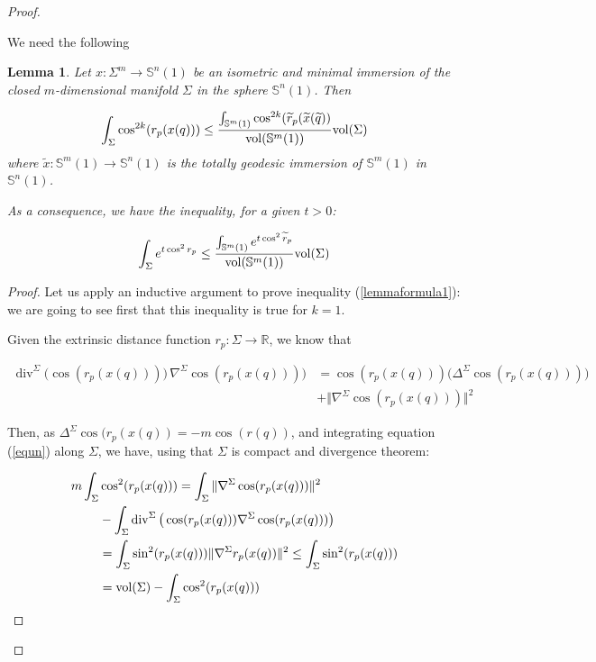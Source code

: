 \documentclass{amsart}
\newtheorem{lemma}[theorem]{Lemma}
\theoremstyle{definition}
\theoremstyle{remark}
\newcommand{\Div}{\operatorname{div}}
\newcommand{\erre}{\mathbb{R}}
\newcommand{\ese}{\mathbb{S}}
\begin{document}
\begin{proof}\

We need the following 

\begin{lemma}
Let  $x: \Sigma^m \to \mathbb{S}^n(1)$ be an isometric and minimal immersion of the closed $m$-dimensional manifold $\Sigma$ in the sphere  $\mathbb{S}^n(1)$. Then

\begin{equation}\label{lemmaformula1}
\int_\Sigma \cos^{2k}(r_p(x(q))) \leq \frac{\int_{\mathbb{S}^m(1)} \cos^{2k}(\widetilde{r}_p(\widetilde{x}(\widetilde{q}))}{{\rm vol}(\mathbb{S}^m(1))} {\rm vol}(\Sigma)
\end{equation}
\noindent where  $\widetilde{x}: \mathbb{S}^m(1) \rightarrow \mathbb{S}^n(1)$ is the totally geodesic immersion of $\ese^m(1)$ in $\ese^n(1)$.   

As a consequence, we have the inequality,  for a given $t>0$:

\begin{equation}\label{lemmaformula2}
\int_{\Sigma} e^{t \cos^2r_p}  \leq\frac{\int_{\ese^m(1)} e^{t \cos^2\widetilde{r}_p}}{{\rm vol}(\mathbb{S}^m(1))} {\rm vol}(\Sigma)
\end{equation}
\end{lemma}
\begin{proof}

Let us apply an inductive argument to prove inequality (\ref{lemmaformula1}): we are going to see first that this inequality is true for $k=1$. 

Given the extrinsic distance function $r_p: \Sigma \rightarrow \erre$, we know that

\begin{equation}\label{equn}
\begin{aligned}
\Div^\Sigma\big(\cos (r_p(x(q))))\,\nabla^\Sigma \cos(r_p(x(q)))\big)&=\cos(r_p(x(q)))\big(\Delta^\Sigma\cos(r_p(x(q)))\big)\\&+\Vert \nabla^\Sigma \cos(r_p(x(q)))\Vert^2
\end{aligned}
\end{equation}

 \noindent Then, as $\Delta^\Sigma \cos(r_p(x(q))=-m\cos(r(q))$, and integrating equation (\ref{equn}) along $\Sigma$, we have, using that $\Sigma$ is compact and divergence theorem:

\begin{equation}\label{eqdoss}
\begin{aligned}
m\int_\Sigma& \cos^2(r_p(x(q)))=\int_\Sigma\Vert \nabla^{\Sigma}  \cos(r_p(x(q)))\Vert^2\\&-\int_\Sigma \Div^\Sigma\big(\cos(r_p(x(q)))\nabla^\Sigma \cos(r_p(x(q)))\big)
\\&=\int_\Sigma \sin^2(r_p(x(q)))\Vert \nabla^{\Sigma} r_p(x(q))\Vert^2\leq \int_\Sigma \sin^2(r_p(x(q)))\\&={\rm vol}(\Sigma)- \int_\Sigma \cos^2(r_p(x(q)))
\end{aligned}
\end{equation}


\end{proof}
\end{proof}
\end{document}
